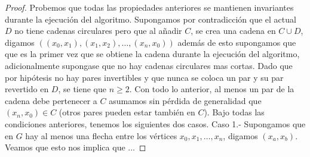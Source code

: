 \begin{teorema}
\begin{proof}
    Probemos que todas las propiedades anteriores se mantienen invariantes durante la ejecución del algoritmo.
    Supongamos por contradicción que el actual $D$ no tiene cadenas circulares pero que al añadir $C$, se crea una cadena en $C\cup D$, digamos $((x_0,x_1),(x_1,x_2),\dots, (x_n,x_0))$ además de esto supongamos que que es la primer vez que se obtiene la cadena durante la ejecución del algoritmo, adicionalmente supongase que no hay cadenas circulares mas cortas. Dado que por hipótesis no hay pares invertibles y que nunca se coloca un par y su par revertido en $D$, se tiene que $n\geq 2$. Con todo lo anterior, al menos un par de la cadena debe pertenecer a $C$ asumamos sin pérdida de generalidad que $(x_n,x_0)\in C$ (otros pares pueden estar también en $C$).
    Bajo todas las condiciones anteriores, tenemos los siguientes dos casos.
    Caso 1.- Supongamos que en $G$ hay al menos una flecha entre los vértices $x_0,x_1,\dots,x_n$, digamos $(x_a,x_b)$. Veamos que esto nos implica que ...
 \end{proof}
        
        
        
        
 \end{teorema}